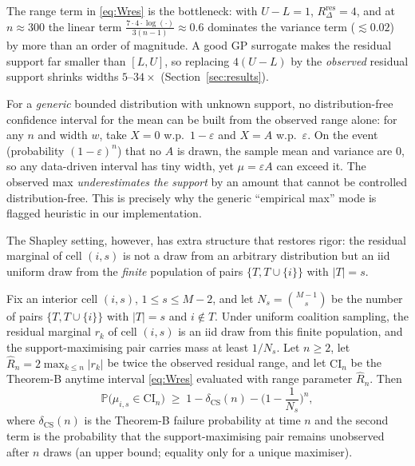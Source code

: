 \documentclass[preprint,12pt]{elsarticle}
\newcommand{\P}{\mathbb{P}}
\begin{document}
The range term in \eqref{eq:Wres} is the bottleneck: with $U-L=1$, $R_\Delta^{\mathrm{res}}=4$, and at $n\approx300$ the linear term $\frac{7\cdot4\cdot\log(\cdot)}{3(n-1)}\approx0.6$ dominates the variance term ($\lesssim0.02$) by more than an order of magnitude. A good GP surrogate makes the residual support far smaller than $[L,U]$, so replacing $4(U-L)$ by the \emph{observed} residual support shrinks widths $5$--$34\times$ (Section~\ref{sec:results}).

\begin{remark}\label{rem:imposs}
For a \emph{generic} bounded distribution with unknown support, no distribution-free confidence interval for the mean can be built from the observed range alone: for any $n$ and width $w$, take $X=0$ w.p.\ $1-\varepsilon$ and $X=A$ w.p.\ $\varepsilon$. On the event (probability $(1-\varepsilon)^n$) that no $A$ is drawn, the sample mean and variance are $0$, so any data-driven interval has tiny width, yet $\mu=\varepsilon A$ can exceed it. The observed max \emph{underestimates the support} by an amount that cannot be controlled distribution-free. This is precisely why the generic ``empirical max'' mode is flagged heuristic in our implementation.
\end{remark}

The Shapley setting, however, has extra structure that restores rigor: the residual marginal of cell $(i,s)$ is not a draw from an arbitrary distribution but an iid uniform draw from the \emph{finite} population of pairs $\{T,T\cup\{i\}\}$ with $|T|=s$.

\begin{theorem}\label{thm:E}
Fix an interior cell $(i,s)$, $1\le s\le M-2$, and let $N_s=\binom{M-1}{s}$ be the number of pairs $\{T,T\cup\{i\}\}$ with $|T|=s$ and $i\notin T$. Under uniform coalition sampling, the residual marginal $r_k$ of cell $(i,s)$ is an iid draw from this finite population, and the support-maximising pair carries mass at least $1/N_s$. Let $n\ge2$, let $\hat R_n=2\max_{k\le n}|r_k|$ be twice the observed residual range, and let $\mathrm{CI}_n$ be the Theorem-B anytime interval \eqref{eq:Wres} evaluated with range parameter $\hat R_n$. Then
\begin{equation}
\P\!\big(\mu_{i,s}\in\mathrm{CI}_n\big)\;\ge\;1-\delta_{\mathrm{CS}}(n)-\Big(1-\frac1{N_s}\Big)^{n},
\label{eq:thmE}
\end{equation}
where $\delta_{\mathrm{CS}}(n)$ is the Theorem-B failure probability at time $n$ and the second term is the probability that the support-maximising pair remains unobserved after $n$ draws (an upper bound; equality only for a unique maximiser).
\end{theorem}
\end{document}
